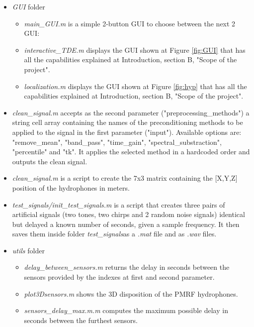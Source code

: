 \begin{itemize}
  \item \emph{GUI} folder
    \begin{itemize}
      \item \emph{main\_GUI.m} \cite{mainGUI.m} is a simple 2-button GUI to choose between the next 2 GUI:
      \item \emph{interactive\_TDE.m} \cite{interactiveTDE.m} displays the GUI shown at Figure \ref{fig:GUI} that has all the capabilities explained at Introduction, section B, "Scope of the project".
      \item \emph{localization.m} \cite{localization.m} displays the GUI shown at Figure \ref{fig:hyp} that has all the capabilities explained at Introduction, section B, "Scope of the project".
    \end{itemize}
    
  \item \emph{clean\_signal.m} \cite{cleansignal.m} accepts as the second parameter ("preprocessing\_methods") a string cell array containing the names of the preconditioning methods to be applied to the signal in the first parameter ("input"). Available options are:
"remove\_mean", "band\_pass", "time\_gain", "spectral\_substraction", "percentile" and "tk". It applies the selected method in a hardcoded order and outputs the clean signal.
    
  \item \emph{clean\_signal.m} \cite{cleansignal.m} is a script to create the 7x3 matrix containing the [X,Y,Z] position of the hydrophones in meters.
    
  \item \emph{test\_signals/init\_test\_signals.m} \cite{inittestsignals.m} is a script that creates three pairs of artificial signals (two tones, two chirps and 2 random noise signals) identical but delayed a known number of seconds, given a sample frequency. It then saves them inside folder \emph{test\_signals}as a \emph{.mat} file and as \emph{.wav} files.
    
  \item \emph{utils} folder
    \begin{itemize}
      \item \emph{delay\_between\_sensors.m} \cite{delaybetweensensors.m} returns the delay in seconds between the sensors provided by the indexes at first and second parameter.
      \item \emph{plot3Dsensors.m} \cite{plot3Dsensors.m} shows the 3D disposition of the PMRF hydrophones.
      \item \emph{sensors\_delay\_max.m.m} \cite{maxdelay.m} computes the maximum possible delay in seconds between the furthest sensors.
    \end{itemize}
    
\end{itemize}
